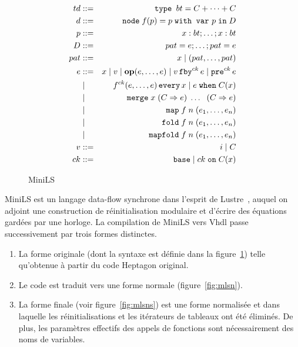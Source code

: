 \documentclass[a4paper]{article}
\newcommand{\LANG}{{\sc Heptagon}}
\newcommand{\lustre}{{\sc Lustre}}
\newcommand{\minils}{{\sc MiniLS}}
\newcommand{\vhdl}{{\sc Vhdl}}
\newcommand{\p}[0]{\; \vert \;}
\newcommand{\mybox}[1]{\mbox{\tt{#1}}}
\newcommand{\Coloneqq}[0]{::=}
\newcommand{\Node}[4]{\mybox{node} \; f(#1) = #2 \; \mybox{with var} \
  #3 \; \mybox{in} \; #4}
\newcommand{\Op}[2]{\mybox{\bf{op}}(#1,\dots,#2)}
\newcommand{\Fby}[2]{#1 \, \mybox{fby}^{ck} \, #2}
\newcommand{\Pre}[1]{\mybox{pre}^{ck} \, #1}
\newcommand{\Every}[4]{#1^{ck}(#2,\dots,#3) \, \mybox{every} \, #4}
\newcommand{\When}[3]{#1 \; \mybox{when} \; #2(#3)}
\newcommand{\Merge}[5]{\mybox{merge} \; #1 \; (#2 \Rightarrow #3) \; \dots \; \
  (#4 \Rightarrow #5)}
\newcommand{\Base}[0]{\mybox{base}}
\newcommand{\On}[3]{#1 \; \mybox{on} \; #2 (#3)}
\newcommand{\Map}[3]{\mathtt{map} \; #1\; n\; (#2,\dots,#3)}
\newcommand{\Fold}[3]{\mathtt{fold} \; #1\; n\; (#2,\dots,#3)}
\newcommand{\Mapfold}[3]{\mathtt{mapfold} \; #1\; n\; (#2,\dots,#3)}
\begin{document}
\begin{figure}[h]
  \centering
  \begin{eqnarray*}
    td & \Coloneqq & \mybox{type } bt = C + \dots + C \\
    d & \Coloneqq & \Node{p}{p}{p}{D} \\
    p & \Coloneqq & x : bt; \dots; x : bt \\
    D & \Coloneqq & pat = e; \dots; pat = e \\
    pat & \Coloneqq & x \p (pat,\dots,pat) \\
    e & \Coloneqq & x \p v \p \Op{e}{e} \p \Fby{v}{e} \p \Pre{e} \\
    & \p & \Every{f}{e}{e}{x} \p \When{e}{C}{x} \\
    & \p & \Merge{x}{C}{e}{C}{e} \\
    & \p & \Map{f}{e_1}{e_n} \\
    & \p & \Fold{f}{e_1}{e_n} \\
    & \p & \Mapfold{f}{e_1}{e_n} \\
    v & \Coloneqq & i \p C \\
    ck & \Coloneqq & \Base \p \On{ck}{C}{x}
  \end{eqnarray*}
  \caption{\minils}
  \label{fig:mls}
\end{figure}

\minils{} est un langage data-flow synchrone dans l'esprit de
\lustre~\cite{lustre:ieee91}, auquel on adjoint une construction de
r\'einitialisation modulaire et d'\'ecrire des \'equations gard\'ees par une
horloge. La compilation de \minils{} vers \vhdl{} passe successivement
par trois formes distinctes.

\begin{enumerate}
\item La forme originale (dont la syntaxe est d\'efinie dans la
  figure~\ref{fig:mls}) telle qu'obtenue \`a partir du code \LANG{}
  original.
\item Le code est traduit vers une forme normale
  (figure~\ref{fig:mlsn}).
\item La forme finale (voir figure~\ref{fig:mlsns}) est une forme
  normalis\'ee et dans laquelle les r\'einitialisations et les it\'erateurs
  de tableaux ont \'et\'e \'elimin\'es. De plus, les param\`etres effectifs des
  appels de fonctions sont n\'ecessairement des noms de variables.
\end{enumerate}
\end{document}
